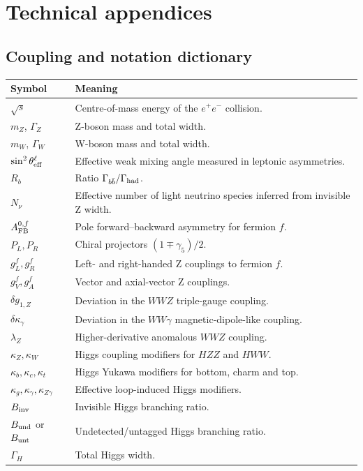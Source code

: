 \documentclass[11pt,a4paper]{report}
\newcommand{\ee}{e^+e^-}
\begin{document}
\part{Technical appendices}
\appendix
\chapter{Coupling and notation dictionary}
\begin{longtable}{p{}p{}}
\toprule
Symbol & Meaning \\
\midrule
$\sqrt{s}$ & Centre-of-mass energy of the $\ee$ collision. \\
$m_Z$, $\Gamma_Z$ & Z-boson mass and total width. \\
$m_W$, $\Gamma_W$ & W-boson mass and total width. \\
$\sin^2\theta_{\rm eff}^\ell$ & Effective weak mixing angle measured in leptonic asymmetries. \\
$R_b$ & Ratio $\Gamma_{b\bar b}/\Gamma_{\rm had}$. \\
$N_\nu$ & Effective number of light neutrino species inferred from invisible Z width. \\
$A_{\rm FB}^{0,f}$ & Pole forward--backward asymmetry for fermion $f$. \\
$P_L,P_R$ & Chiral projectors $(1\mp\gamma_5)/2$. \\
$g_L^f,g_R^f$ & Left- and right-handed Z couplings to fermion $f$. \\
$g_V^f,g_A^f$ & Vector and axial-vector Z couplings. \\
$\delta g_{1,Z}$ & Deviation in the $WWZ$ triple-gauge coupling. \\
$\delta\kappa_\gamma$ & Deviation in the $WW\gamma$ magnetic-dipole-like coupling. \\
$\lambda_Z$ & Higher-derivative anomalous $WWZ$ coupling. \\
$\kappa_Z,\kappa_W$ & Higgs coupling modifiers for $HZZ$ and $HWW$. \\
$\kappa_b,\kappa_c,\kappa_t$ & Higgs Yukawa modifiers for bottom, charm and top. \\
$\kappa_g,\kappa_\gamma,\kappa_{Z\gamma}$ & Effective loop-induced Higgs modifiers. \\
$B_{\rm inv}$ & Invisible Higgs branching ratio. \\
$B_{\rm und}$ or $B_{\rm unt}$ & Undetected/untagged Higgs branching ratio. \\
$\Gamma_H$ & Total Higgs width. \\

\end{longtable}
\end{document}
